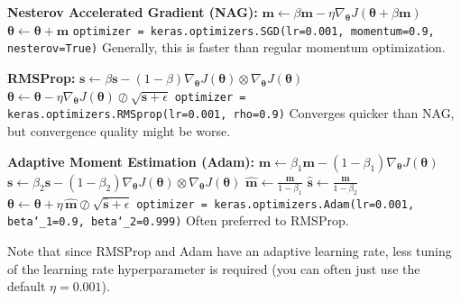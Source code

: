 \textbf{Nesterov Accelerated Gradient (NAG):}\newline
$\boldsymbol{m} \leftarrow \beta \boldsymbol{m} - \eta \nabla_{\boldsymbol{\theta}} J (\boldsymbol{\theta} + \beta \boldsymbol{m})$\newline
$\boldsymbol{\theta} \leftarrow \boldsymbol{\theta} + \boldsymbol{m}$\newline
\texttt{optimizer = keras.optimizers.SGD(lr=0.001, momentum=0.9, nesterov=True)}\newline
Generally, this is faster than regular momentum optimization.\newline

\textbf{RMSProp:}\newline
$\boldsymbol{s} \leftarrow \beta \boldsymbol{s} - (1 - \beta) \nabla_{\boldsymbol{\theta}} J (\boldsymbol{\theta}) \otimes \nabla_{\boldsymbol{\theta}} J (\boldsymbol{\theta})$\newline
$\boldsymbol{\theta} \leftarrow \boldsymbol{\theta} - \eta  \nabla_{\boldsymbol{\theta}} J (\boldsymbol{\theta}) \oslash \sqrt{\boldsymbol{s} + \epsilon} $\newline
\texttt{optimizer = keras.optimizers.RMSprop(lr=0.001, rho=0.9)}\newline
Converges quicker than NAG, but convergence quality might be worse.\newline

\textbf{Adaptive Moment Estimation (Adam):}\newline
$\boldsymbol{m} \leftarrow \beta_1 \boldsymbol{m} - (1 - \beta_1) \nabla_{\boldsymbol{\theta}} J (\boldsymbol{\theta})$\newline
$\boldsymbol{s} \leftarrow \beta_2 \boldsymbol{s} - (1 - \beta_2) \nabla_{\boldsymbol{\theta}} J (\boldsymbol{\theta}) \otimes \nabla_{\boldsymbol{\theta}} J (\boldsymbol{\theta})$\newline
$\widehat{\boldsymbol{m}} \leftarrow \frac{\boldsymbol{m}}{1-\beta_1}$\newline
$\widehat{\boldsymbol{s}} \leftarrow \frac{\boldsymbol{m}}{1-\beta_2}$\newline
$\boldsymbol{\theta} \leftarrow \boldsymbol{\theta} + \eta \, \widehat{\boldsymbol{m}} \oslash \sqrt{\widehat{\boldsymbol{s}} + \epsilon}$\newline
\texttt{optimizer = keras.optimizers.Adam(lr=0.001, beta\char`_1=0.9, beta\char`_2=0.999)}\newline
Often preferred to RMSProp.

Note that since RMSProp and Adam have an adaptive learning rate,
less tuning of the learning rate hyperparameter is required (you can often just use the default $\eta=0.001$).\newline

